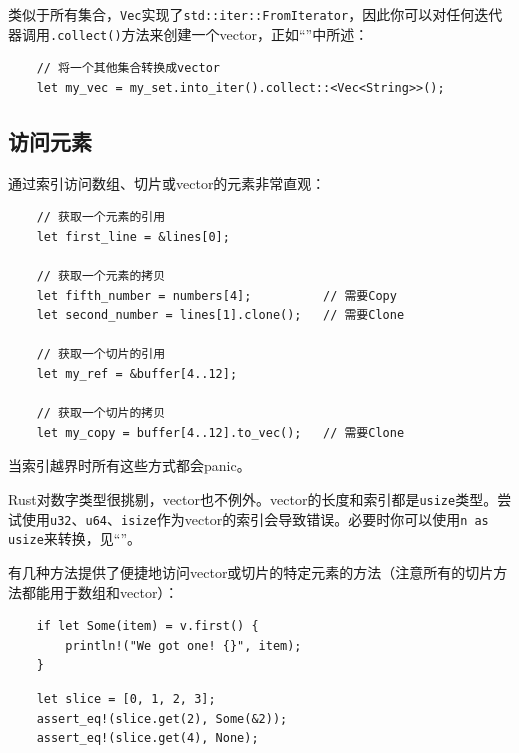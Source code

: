 类似于所有集合，\texttt{Vec}实现了\texttt{std::iter::FromIterator}，因此你可以对任何迭代器调用\texttt{.collect()}方法来创建一个vector，正如“”中所述：
\begin{verbatim}
    // 将一个其他集合转换成vector
    let my_vec = my_set.into_iter().collect::<Vec<String>>();
\end{verbatim}

\subsection{访问元素}
通过索引访问数组、切片或vector的元素非常直观：
\begin{verbatim}
    // 获取一个元素的引用
    let first_line = &lines[0];

    // 获取一个元素的拷贝 
    let fifth_number = numbers[4];          // 需要Copy
    let second_number = lines[1].clone();   // 需要Clone

    // 获取一个切片的引用
    let my_ref = &buffer[4..12];

    // 获取一个切片的拷贝
    let my_copy = buffer[4..12].to_vec();   // 需要Clone
\end{verbatim}

当索引越界时所有这些方式都会panic。

Rust对数字类型很挑剔，vector也不例外。vector的长度和索引都是\texttt{usize}类型。尝试使用\texttt{u32}、\texttt{u64}、\texttt{isize}作为vector的索引会导致错误。必要时你可以使用\texttt{n as usize}来转换，见“”。

有几种方法提供了便捷地访问vector或切片的特定元素的方法（注意所有的切片方法都能用于数组和vector）：
\begin{verbatim}
    if let Some(item) = v.first() {
        println!("We got one! {}", item);
    }
\end{verbatim}


\begin{verbatim}
    let slice = [0, 1, 2, 3];
    assert_eq!(slice.get(2), Some(&2));
    assert_eq!(slice.get(4), None);
\end{verbatim}

